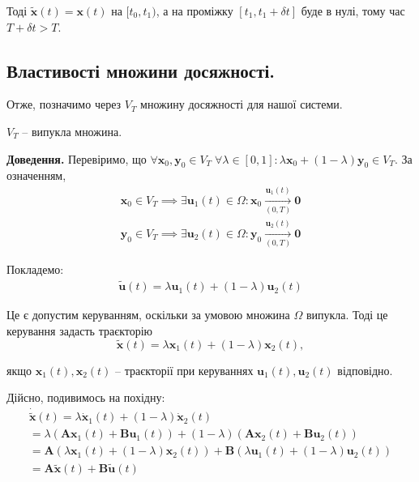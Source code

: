 \documentclass[14pt]{extarticle}
\newcommand{\<}{\langle}
\renewcommand{\>}{\rangle}
\theoremstyle{mystyle}{\newtheorem{definition}{Definition}[section]}
\theoremstyle{mystyle}{\newtheorem{proposition}[definition]{Proposition}}
\theoremstyle{mystyle}{\newtheorem{theorem}[definition]{Theorem}}
\theoremstyle{mystyle}{\newtheorem{lemma}[definition]{Lemma}}
\theoremstyle{mystyle}{\newtheorem{corollary}[definition]{Corollary}}
\theoremstyle{mystyle}{\newtheorem*{remark}{Remark}}
\theoremstyle{mystyle}{\newtheorem*{remarks}{Remarks}}
\theoremstyle{mystyle}{\newtheorem*{example}{Example}}
\theoremstyle{mystyle}{\newtheorem*{examples}{Examples}}
\theoremstyle{definition}{\newtheorem*{exercise}{Exercise}}
\theoremstyle{cstyle}{\newtheorem*{cthm}{}}
\theoremstyle{warn}
\begin{document}
Тоді $\widetilde{\mathbf{x}}(t) = \mathbf{x}(t)$ на $[t_0,t_1)$, а на проміжку $[t_1,t_1+\delta t]$ буде в нулі, тому час $T+\delta t > T$.

\subsection{Властивості множини досяжності.}

Отже, позначимо через $V_T$ множину досяжності для нашої системи.

\begin{lemma}
    $V_T$ -- випукла множина.
\end{lemma}

\textbf{Доведення.} Перевіримо, що $\forall \mathbf{x}_0,\mathbf{y}_0 \in V_T \; \forall \lambda \in [0,1]: \lambda\mathbf{x}_0+(1-\lambda)\mathbf{y}_0 \in V_T$. За означенням,
\begin{gather}
    \mathbf{x}_0 \in V_T \implies \exists \mathbf{u}_1(t) \in \Omega: \mathbf{x}_0 \xrightarrow[(0,T)]{\mathbf{u}_1(t)} \mathbf{0} \\
    \mathbf{y}_0 \in V_T \implies \exists \mathbf{u}_2(t) \in \Omega: \mathbf{y}_0 \xrightarrow[(0,T)]{\mathbf{u}_2(t)} \mathbf{0}
\end{gather}

Покладемо:
\begin{gather}
    \widetilde{\mathbf{u}}(t) = \lambda\mathbf{u}_1(t) + (1-\lambda)\mathbf{u}_2(t) 
\end{gather}

Це є допустим керуванням, оскільки за умовою множина $\Omega$ випукла. Тоді це керування задасть траєкторію
\begin{equation}
    \widetilde{\mathbf{x}}(t) = \lambda\mathbf{x}_1(t) + (1-\lambda)\mathbf{x}_2(t),
\end{equation}

якщо $\mathbf{x}_1(t),\mathbf{x}_2(t)$ -- траєкторії при керуваннях $\mathbf{u}_1(t),\mathbf{u}_2(t)$ відповідно.

Дійсно, подивимось на похідну:
\begin{align}
    \dot{\widetilde{\mathbf{x}}}(t) = \lambda\dot{\mathbf{x}}_1(t) + (1-\lambda)\dot{\mathbf{x}}_2(t) \nonumber \\
    =\lambda(\boldsymbol{A}\mathbf{x}_1(t) + \boldsymbol{B}\mathbf{u}_1(t)) + (1-\lambda)(\boldsymbol{A}\mathbf{x}_2(t) + \boldsymbol{B}\mathbf{u}_2(t)) \nonumber \\
    =\boldsymbol{A}(\lambda\mathbf{x}_1(t) + (1-\lambda)\mathbf{x}_2(t)) + \boldsymbol{B}(\lambda\mathbf{u}_1(t)+(1-\lambda)\mathbf{u}_2(t)) \\
    = \boldsymbol{A}\widetilde{\boldsymbol{x}}(t) + \boldsymbol{B}\widetilde{\mathbf{u}}(t)
\end{align}
\end{document}

